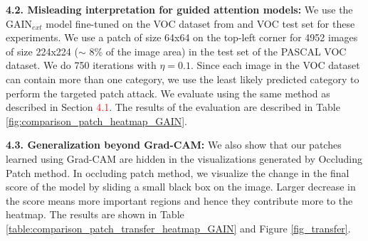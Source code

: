 \documentclass[10pt,twocolumn,letterpaper]{article}
\begin{document}





{\bf 4.2. Misleading interpretation for guided attention models:}
We use the GAIN{${_{ext}}$} model fine-tuned on the VOC dataset from \cite{kunpeng2018gain} and VOC test set for these experiments. We use a patch of size 64x64 on the top-left corner for 4952 images of size 224x224 ($\sim$ 8\% of the image area) in the test set of the PASCAL VOC dataset. We do 750 iterations with $\eta = 0.1$. Since each image in the VOC dataset can contain more than one category, we use the least likely predicted category to perform the targeted patch attack. We evaluate using the same method as described in Section
{\textcolor{red}{4.1}}. %
The results of the evaluation are described in Table \ref{fig:comparison_patch_heatmap_GAIN}.

{\bf 4.3. Generalization beyond Grad-CAM:} We also show that our patches learned using Grad-CAM are hidden in the visualizations generated by Occluding Patch \cite{zhou2014object} method. In occluding patch method, we visualize the change in the final score of the model by sliding a small black box on the image. Larger decrease in the score means more important regions and hence they contribute more to the heatmap. The results are shown in Table \ref{table:comparison_patch_transfer_heatmap_GAIN} and Figure \ref{fig_transfer}.
\end{document}

